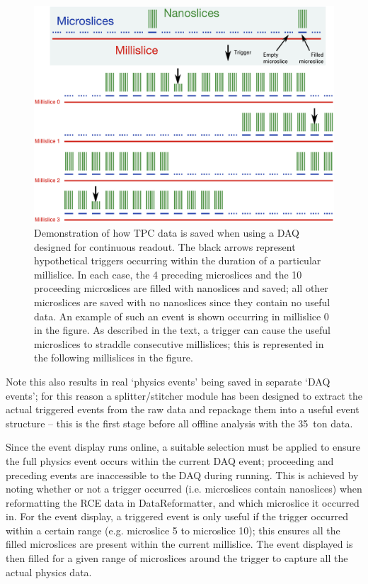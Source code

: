 \begin{figure}[ht]
  \centering
  \includegraphics[width=16cm]{triggered_event.eps}
  \caption[Demonstration of how TPC data from a triggered event in a LArTPC is saved when employing a DAQ with continuous readout]{Demonstration of how TPC data is saved when using a DAQ designed for continuous readout.  The black arrows represent hypothetical triggers occurring within the duration of a particular millislice.  In each case, the 4 preceding microslices and the 10 proceeding microslices are filled with nanoslices and saved; all other microslices are saved with no nanoslices since they contain no useful data.  An example of such an event is shown occurring in millislice 0 in the figure.  As described in the text, a trigger can cause the useful microslices to straddle consecutive millislices; this is represented in the following millislices in the figure.}
  \label{fig:TriggeredEvent}
\end{figure}
Note this also results in real `physics events' being saved in separate `DAQ events'; for this reason a splitter/stitcher module has been designed to extract the actual triggered events from the raw data and repackage them into a useful event structure -- this is the first stage before all offline analysis with the 35~ton data.

Since the event display runs online, a suitable selection must be applied to ensure the full physics event occurs within the current DAQ event; proceeding and preceding events are inaccessible to the DAQ during running.  This is achieved by noting whether or not a trigger occurred (i.e. microslices contain nanoslices) when reformatting the RCE data in DataReformatter, and which microslice it occurred in.  For the event display, a triggered event is only useful if the trigger occurred within a certain range (e.g. microslice 5 to microslice 10); this ensures all the filled microslices are present within the current millislice.  The event displayed is then filled for a given range of microslices around the trigger to capture all the actual physics data.

